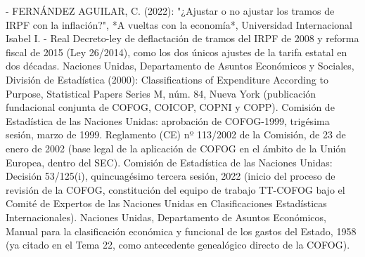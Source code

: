 \documentclass[10pt,a4paper]{article}
\begin{document}
- FERNÁNDEZ AGUILAR, C. (2022): "¿Ajustar o no ajustar los tramos de IRPF con la inflación?", *A vueltas con la economía*, Universidad Internacional Isabel I.
- Real Decreto-ley de deflactación de tramos del IRPF de 2008 y reforma fiscal de 2015 (Ley 26/2014), como los dos únicos ajustes de la tarifa estatal en dos décadas.
Naciones Unidas, Departamento de Asuntos Económicos y Sociales, División de Estadística (2000): Classifications of Expenditure According to Purpose, Statistical Papers Series M, núm. 84, Nueva York (publicación fundacional conjunta de COFOG, COICOP, COPNI y COPP).
Comisión de Estadística de las Naciones Unidas: aprobación de COFOG-1999, trigésima sesión, marzo de 1999.
Reglamento (CE) nº 113/2002 de la Comisión, de 23 de enero de 2002 (base legal de la aplicación de COFOG en el ámbito de la Unión Europea, dentro del SEC).
Comisión de Estadística de las Naciones Unidas: Decisión 53/125(i), quincuagésimo tercera sesión, 2022 (inicio del proceso de revisión de la COFOG, constitución del equipo de trabajo TT-COFOG bajo el Comité de Expertos de las Naciones Unidas en Clasificaciones Estadísticas Internacionales).
Naciones Unidas, Departamento de Asuntos Económicos, Manual para la clasificación económica y funcional de los gastos del Estado, 1958 (ya citado en el Tema 22, como antecedente genealógico directo de la COFOG).
\end{document}

